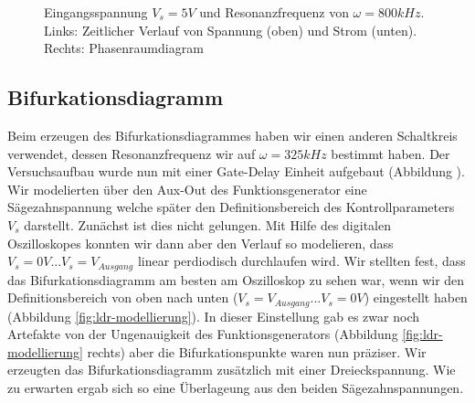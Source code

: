 \documentclass{scrartcl}
\begin{document}
\begin{figure}[!htbp]
\caption{Eingangsspannung $V_s=5V$ und Resonanzfrequenz von $\omega=800kHz$. Links: Zeitlicher Verlauf von Spannung (oben) und Strom (unten). Rechts: Phasenraumdiagram}
\label{fig:ldr-real2}
\end{figure}
\subsection { Bifurkationsdiagramm }
Beim erzeugen des Bifurkationsdiagrammes haben wir einen anderen Schaltkreis verwendet, dessen Resonanzfrequenz wir auf $\omega=325kHz$ bestimmt haben. Der Versuchsaufbau wurde nun mit einer Gate-Delay Einheit aufgebaut (Abbildung \label{fig:ldr-aufbau1}). Wir modelierten über den Aux-Out des Funktionsgenerator eine Sägezahnspannung welche später den Definitionsbereich des Kontrollparameters $V_s$ darstellt. 
Zunächst ist dies nicht gelungen. Mit Hilfe des digitalen Oszilloskopes konnten wir dann aber den Verlauf so modelieren, dass  $V_s=0V...V_s=V_{Ausgang}$ linear perdiodisch durchlaufen wird. 
Wir stellten fest, dass das Bifurkationsdiagramm am besten am Oszilloskop zu sehen war, wenn wir den Definitionsbereich von oben nach unten ($V_s=V_{Ausgang}...V_s=0V$) eingestellt haben (Abbildung \ref{fig:ldr-modellierung}). In dieser Einstellung gab es zwar noch Artefakte von der Ungenauigkeit des Funktionsgenerators (Abbildung \ref{fig:ldr-modellierung} rechts) aber die Bifurkationspunkte waren nun präziser. Wir erzeugten das Bifurkationsdiagramm zusätzlich mit einer Dreieckspannung. Wie zu erwarten ergab sich so eine Überlageung aus den beiden Sägezahnspannungen. 
\end{document}
